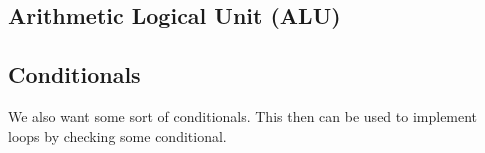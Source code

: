   \begin{theorem}
    
  \end{theorem}

\subsection{Arithmetic Logical Unit (ALU)}

\subsection{Conditionals}

  We also want some sort of conditionals. This then can be used to implement loops by checking some conditional. 

  \begin{theorem}
    
  \end{theorem}


